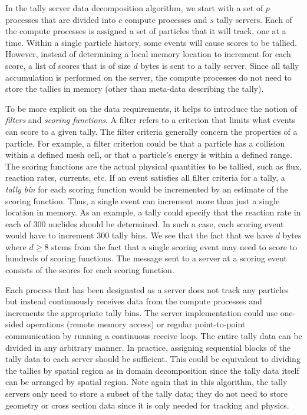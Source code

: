 \documentclass[3p]{elsarticle}
\begin{document}
In the tally server data decomposition algorithm, we start with a set of $p$
processes that are divided into $c$ compute processes and $s$ tally
servers. Each of the compute processes is assigned a set of particles that it
will track, one at a time. Within a single particle history, some events will
cause scores to be tallied. However, instead of determining a local memory
location to increment for each score, a list of scores that is of size $d$ bytes
is sent to a tally server. Since all tally accumulation is performed on the
server, the compute processes do not need to store the tallies in memory (other
than meta-data describing the tally).

To be more explicit on the data requirements, it helps to introduce the notion
of {\em filters} and {\em scoring functions}. A filter refers to a criterion
that limits what events can score to a given tally.  The filter criteria
generally concern the properties of a particle. For example, a filter criterion
could be that a particle has a collision within a defined mesh cell, or that a
particle's energy is within a defined range. The scoring functions are the
actual physical quantities to be tallied, such as flux, reaction rates,
currents, etc. If an event satisfies all filter criteria for a tally, a {\em
  tally bin} for each scoring function would be incremented by an estimate of
the scoring function. Thus, a single event can increment more than just a single
location in memory. As an example, a tally could specify that the reaction rate
in each of 300 nuclides should be determined. In such a case, each scoring event
would have to increment 300 tally bins. We see that the fact that we have $d$
bytes where $d \ge 8$ stems from the fact that a single scoring event may need
to score to hundreds of scoring functions. The message sent to a server at a
scoring event consists of the scores for each scoring function.

Each process that has been designated as a server does not track any particles
but instead continuously receives data from the compute processes and increments
the appropriate tally bins. The server implementation could use one-sided
operations (remote memory access) or regular point-to-point communication by
running a continuous receive loop. The entire tally data can be divided in any
arbitrary manner. In practice, assigning sequential blocks of the tally data to
each server should be sufficient. This could be equivalent to dividing the
tallies by spatial region as in domain decomposition since the tally data itself
can be arranged by spatial region. Note again that in this algorithm, the tally
servers only need to store a subset of the tally data; they do not need to store
geometry or cross section data since it is only needed for tracking and physics.
\end{document}
